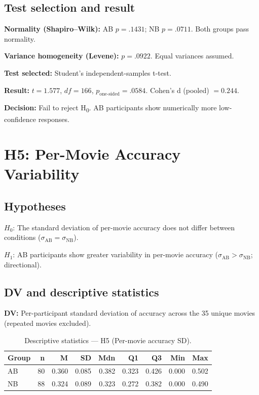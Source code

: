 \documentclass[12pt,a4paper]{article}
\begin{document}
\subsection{Test selection and result}

\textbf{Normality (Shapiro--Wilk):} AB $p = .1431$; NB $p = .0711$. Both groups pass normality.

\textbf{Variance homogeneity (Levene):} $p = .0922$. Equal variances assumed.


\textbf{Test selected:} Student's independent-samples t-test.

\textbf{Result:} $t = 1.577$, $df = 166$, $p_{\text{one-sided}} = .0584$. Cohen's d (pooled) $= 0.244$.

\textbf{Decision:} Fail to reject H\textsubscript{0}. AB participants show numerically more low-confidence responses.


\section{H5: Per-Movie Accuracy Variability}

\subsection{Hypotheses}

$H_0$: The standard deviation of per-movie accuracy does not differ between conditions ($\sigma_{\text{AB}} = \sigma_{\text{NB}}$).

$H_1$: AB participants show greater variability in per-movie accuracy ($\sigma_{\text{AB}} > \sigma_{\text{NB}}$; directional).

\subsection{DV and descriptive statistics}

\textbf{DV:} Per-participant standard deviation of accuracy across the 35 unique movies (repeated movies excluded).


\begin{table}[h!]
\centering
\small
\begin{tabular}{lrrrrrrrr}
\hline
\textbf{Group} & \textbf{n} & \textbf{M} & \textbf{SD} & \textbf{Mdn} & \textbf{Q1} & \textbf{Q3} & \textbf{Min} & \textbf{Max} \\
\hline
    AB & 80 & 0.360 & 0.085 & 0.382 & 0.323 & 0.426 & 0.000 & 0.502 \\
    NB & 88 & 0.324 & 0.089 & 0.323 & 0.272 & 0.382 & 0.000 & 0.490 \\
\hline
\end{tabular}
\caption{Descriptive statistics --- H5 (Per-movie accuracy SD).}
\label{tab:h5_desc}
\end{table}
\end{document}
